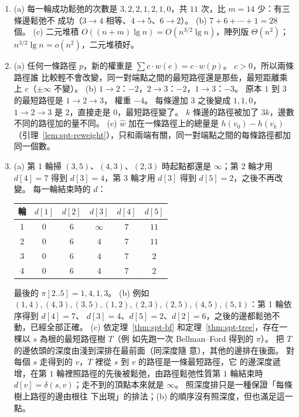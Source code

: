 \begin{enumerate}
\item (a) 每一輪成功鬆弛的次數是 $3, 2, 2, 1, 2, 1, 0$，共 $11$ 次，比 $m = 14$ 少：有三條邊鬆弛不
成功（$3 \to 4$ 相等、$4 \to 5$、$6 \to 2$）。 (b) $7 + 6 + \cdots + 1 = 28$ 個。 (c) 二元堆積
$O((n + m) \lg n) = O(n^{3/2} \lg n)$，陣列版 $\Theta(n^2)$；$n^{3/2} \lg n = o(n^2)$，二元堆積好。

\item (a) 任何一條路徑 $p$，新的權重是 $\sum c \cdot w(e) = c \cdot w(p)$。 $c > 0$，所以兩條路徑誰
比較輕不會改變，同一對端點之間的最短路徑還是那些，最短距離乘上 $c$（$\pm\infty$ 不變）。
(b) $1 \to 2$：$-2$，$2 \to 3$：$-2$，$1 \to 3$：$-3$。 原本 $1$ 到 $3$ 的最短路徑是 $1 \to 2 \to 3$，
權重 $-4$。 每條邊加 $3$ 之後變成 $1, 1, 0$，$1 \to 2 \to 3$ 是 $2$，直接走是 $0$，最短路徑變了。
$k$ 條邊的路徑被加了 $3k$，邊數不同的路徑加的量不同。 (c) $\hat{w}$ 加在一條路徑上的總量是
$h(v_0) - h(v_k)$（引理~\ref{lem:spt-reweight}），只和兩端有關，同一對端點之間的每條路徑都加
同一個數。

\item (a) 第 1 輪掃 $(3, 5)$、$(4, 3)$、$(2, 3)$ 時起點都還是 $\infty$；第 2 輪才用 $d[4] = 7$
得到 $d[3] = 4$，第 3 輪才用 $d[3]$ 得到 $d[5] = 2$，之後不再改變。 每一輪結束時的 $d$：
\begin{center}
\begin{tabular}{c*{5}{c}}
\toprule
輪 & $d[1]$ & $d[2]$ & $d[3]$ & $d[4]$ & $d[5]$ \\
\midrule
1 & $0$ & $6$ & $\infty$ & $7$ & $11$ \\
2 & $0$ & $6$ & $4$ & $7$ & $11$ \\
3 & $0$ & $6$ & $4$ & $7$ & $2$ \\
4 & $0$ & $6$ & $4$ & $7$ & $2$ \\
\bottomrule
\end{tabular}
\end{center}
最後的 $\pi[2..5] = 1, 4, 1, 3$。
(b) 例如 $(1,4), (4,3), (3,5), (1,2), (2,3), (2,5), (4,5), (5,1)$：第 1 輪依序得到 $d[4] = 7$、
$d[3] = 4$、$d[5] = 2$、$d[2] = 6$，之後的邊都鬆弛不動，已經全部正確。
(c) 依定理~\ref{thm:spt-bf} 和定理~\ref{thm:spt-tree}，存在一棵以 $s$ 為根的最短路徑樹 $T$（例
如先跑一次 Bellman--Ford 得到的 $\pi$）。 把 $T$ 的邊依頭的深度由淺到深排在最前面（同深度隨
意），其他的邊排在後面。 對每個 $s$ 走得到的 $v$，$T$ 裡從 $s$ 到 $v$ 的路徑是一條最短路徑，它
的邊深度遞增，在第 $1$ 輪裡照路徑的先後被鬆弛，由路徑鬆弛性質第 $1$ 輪結束時 $d[v] =
\delta(s, v)$；走不到的頂點本來就是 $\infty$。 照深度排只是一種保證「每條樹上路徑的邊由根往
下出現」的排法；(b) 的順序沒有照深度，但也滿足這一點。


\end{enumerate}
